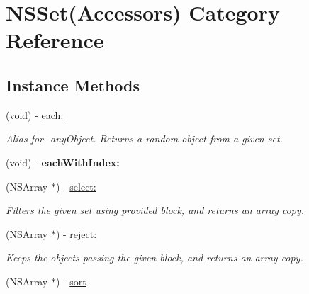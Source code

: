 \hypertarget{category_n_s_set_07_accessors_08}{}\section{N\+S\+Set(Accessors) Category Reference}
\label{category_n_s_set_07_accessors_08}
\subsection*{Instance Methods}
\begin{DoxyCompactItemize}
\item 
\hypertarget{category_n_s_set_07_accessors_08_a45faf79b16427a5d2aa979c4c8ad5638}{}(void) -\/ \hyperlink{category_n_s_set_07_accessors_08_a45faf79b16427a5d2aa979c4c8ad5638}{each\+:}\label{category_n_s_set_07_accessors_08_a45faf79b16427a5d2aa979c4c8ad5638}

\begin{DoxyCompactList}\small\item\em Alias for -\/any\+Object. Returns a random object from a given set. \end{DoxyCompactList}\item 
\hypertarget{category_n_s_set_07_accessors_08_a00c22c07913a7f2db19f0e5b48ce42c6}{}(void) -\/ {\bfseries each\+With\+Index\+:}\label{category_n_s_set_07_accessors_08_a00c22c07913a7f2db19f0e5b48ce42c6}

\item 
\hypertarget{category_n_s_set_07_accessors_08_afc44308c152acc4b7f1fa92e6b6a5428}{}(N\+S\+Array $\ast$) -\/ \hyperlink{category_n_s_set_07_accessors_08_afc44308c152acc4b7f1fa92e6b6a5428}{select\+:}\label{category_n_s_set_07_accessors_08_afc44308c152acc4b7f1fa92e6b6a5428}

\begin{DoxyCompactList}\small\item\em Filters the given set using provided block, and returns an array copy. \end{DoxyCompactList}\item 
\hypertarget{category_n_s_set_07_accessors_08_a1fea12d471527fa6510a3a908c53c349}{}(N\+S\+Array $\ast$) -\/ \hyperlink{category_n_s_set_07_accessors_08_a1fea12d471527fa6510a3a908c53c349}{reject\+:}\label{category_n_s_set_07_accessors_08_a1fea12d471527fa6510a3a908c53c349}

\begin{DoxyCompactList}\small\item\em Keeps the objects passing the given block, and returns an array copy. \end{DoxyCompactList}\item 
\hypertarget{category_n_s_set_07_accessors_08_aa06629960f0b12b1a7695f2aab6f9cbb}{}(N\+S\+Array $\ast$) -\/ \hyperlink{category_n_s_set_07_accessors_08_aa06629960f0b12b1a7695f2aab6f9cbb}{sort}\label{category_n_s_set_07_accessors_08_aa06629960f0b12b1a7695f2aab6f9cbb}


\end{DoxyCompactItemize}
